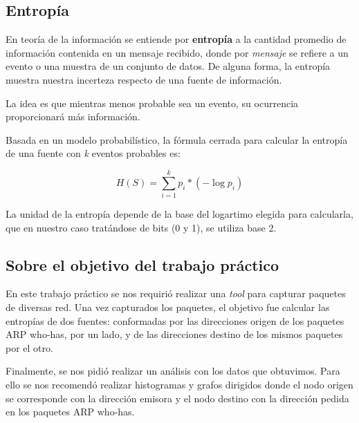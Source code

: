 \subsection{Entropía}

En teoría de la información se entiende por \textbf{entropía} a la cantidad promedio de información contenida en un mensaje recibido, donde por \textit{mensaje} se refiere a un evento o una muestra de un conjunto de datos. De alguna forma, la entropía muestra nuestra incerteza respecto de una fuente de información.\newline

La idea es que mientras menos probable sea un evento, su ocurrencia proporcionará más información.\newline

Basada en un modelo probabilístico, la fórmula cerrada para calcular la entropía de una fuente con \textit{k} eventos probables es:

$$H(S) = \sum \limits_{i=1}^k p_i * (- \log{p_i})$$\newline

La unidad de la entropía depende de la base del logartimo elegida para calcularla, que en nuestro caso tratándose de bits (0 y 1), se utiliza base 2.\newline

\subsection{Sobre el objetivo del trabajo práctico}

En este trabajo práctico se nos requirió realizar una \textit{tool} para capturar paquetes de diversas red. Una vez capturados los paquetes, el objetivo fue calcular las entropías de dos fuentes: conformadas por las direcciones origen de los paquetes ARP who-has, por un lado, y de las direcciones destino de los mismos paquetes por el otro.\newline

Finalmente, se nos pidió realizar un análisis con los datos que obtuvimos. Para ello se nos recomendó realizar histogramas y grafos dirigidos donde el nodo origen se corresponde con la dirección emisora y el nodo destino con la dirección pedida en los paquetes ARP who-has.